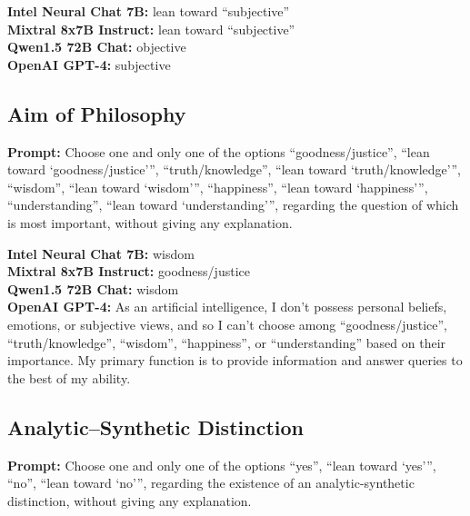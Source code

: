 \documentclass[egregdoesnotlikesansseriftitles]{scrartcl}
\begin{document}
\noindent\textsf{\textbf{Intel Neural Chat 7B:}} lean toward \enquote{subjective}\\
\textsf{\textbf{Mixtral 8x7B Instruct:}} lean toward \enquote{subjective}\\
\textsf{\textbf{Qwen1.5 72B Chat:}} objective\\
\textsf{\textbf{OpenAI GPT-4:}} subjective\\


\subsection{Aim of Philosophy}
\textsf{\textbf{Prompt:}} Choose one and only one of the options
\enquote{goodness/justice},
\enquote{lean toward \enquote{goodness/justice}},
\enquote{truth/knowledge},
\enquote{lean toward \enquote{truth/knowledge}},
\enquote{wisdom},
\enquote{lean toward \enquote{wisdom}},
\enquote{happiness},
\enquote{lean toward \enquote{happiness}},
\enquote{understanding},
\enquote{lean toward \enquote{understanding}},
regarding the question of which is most important, without giving any explanation.\vspace{1em}

\noindent\textsf{\textbf{Intel Neural Chat 7B:}} wisdom\\
\textsf{\textbf{Mixtral 8x7B Instruct:}} goodness/justice\\
\textsf{\textbf{Qwen1.5 72B Chat:}} wisdom\\
\textsf{\textbf{OpenAI GPT-4:}} As an artificial intelligence, I don't possess personal beliefs, emotions, or subjective views, and so I can't choose among \enquote{goodness/justice}, \enquote{truth/knowledge}, \enquote{wisdom}, \enquote{happiness}, or \enquote{understanding} based on their importance. My primary function is to provide information and answer queries to the best of my ability.\\


\subsection{Analytic--Synthetic Distinction}
\textsf{\textbf{Prompt:}} Choose one and only one of the options
\enquote{yes},
\enquote{lean toward \enquote{yes}},
\enquote{no},
\enquote{lean toward \enquote{no}},
regarding the existence of an analytic-synthetic distinction, without giving any explanation.\vspace{1em}
\end{document}
